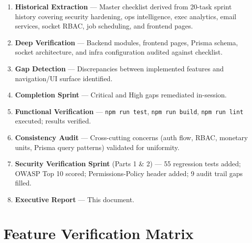 \documentclass[11pt,a4paper]{article}
\begin{document}
\begin{enumerate}[leftmargin=*, label=\textbf{Phase \arabic*.}, itemsep=4pt]
  \item \textbf{Historical Extraction} — Master checklist derived from 20-task
    sprint history covering security hardening, ops intelligence, exec analytics,
    email services, socket RBAC, job scheduling, and frontend pages.
  \item \textbf{Deep Verification} — Backend modules, frontend pages, Prisma schema,
    socket architecture, and infra configuration audited against checklist.
  \item \textbf{Gap Detection} — Discrepancies between implemented features and
    navigation/UI surface identified.
  \item \textbf{Completion Sprint} — Critical and High gaps remediated in-session.
  \item \textbf{Functional Verification} — \texttt{npm run test}, \texttt{npm run
    build}, \texttt{npm run lint} executed; results verified.
  \item \textbf{Consistency Audit} — Cross-cutting concerns (auth flow, RBAC,
    monetary units, Prisma query patterns) validated for uniformity.
  \item \textbf{Security Verification Sprint} (Parts 1 \& 2) — 55 regression tests
    added; OWASP Top 10 scored; Permissions-Policy header added; 9 audit trail
    gaps filled.
  \item \textbf{Executive Report} — This document.
\end{enumerate}

\section{Feature Verification Matrix}
\end{document}
